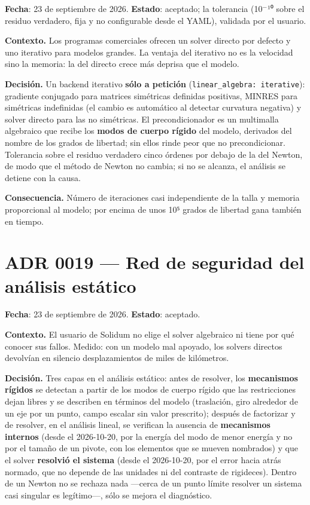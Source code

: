 \documentclass[11pt,oneside]{report}
\begin{document}
\textbf{Fecha}: 23 de septiembre de 2026. \textbf{Estado}: aceptado; la tolerancia (10\ensuremath{^{-}}¹⁰ sobre el residuo verdadero, fija y no configurable desde el YAML), validada por el usuario.

\textbf{Contexto.} Los programas comerciales ofrecen un solver directo por defecto y uno iterativo para modelos grandes. La ventaja del iterativo no es la velocidad sino la memoria: la del directo crece más deprisa que el modelo.

\textbf{Decisión.} Un backend iterativo \textbf{sólo a petición} (\texttt{linear\_\allowbreak{}algebra: iterative}): gradiente conjugado para matrices simétricas definidas positivas, MINRES para simétricas indefinidas (el cambio es automático al detectar curvatura negativa) y solver directo para las no simétricas. El precondicionador es un multimalla algebraico que recibe los \textbf{modos de cuerpo rígido} del modelo, derivados del nombre de los grados de libertad; sin ellos rinde peor que no precondicionar. Tolerancia sobre el residuo verdadero cinco órdenes por debajo de la del Newton, de modo que el método de Newton no cambia; si no se alcanza, el análisis se detiene con la causa.

\textbf{Consecuencia.} Número de iteraciones casi independiente de la talla y memoria proporcional al modelo; por encima de unos 10⁵ grados de libertad gana también en tiempo.

\section{ADR 0019 --- Red de seguridad del análisis estático}
\label{adr:0019}

\textbf{Fecha}: 23 de septiembre de 2026. \textbf{Estado}: aceptado.

\textbf{Contexto.} El usuario de Solidum no elige el solver algebraico ni tiene por qué conocer sus fallos. Medido: con un modelo mal apoyado, los solvers directos devolvían en silencio desplazamientos de miles de kilómetros.

\textbf{Decisión.} Tres capas en el análisis estático: antes de resolver, los \textbf{mecanismos rígidos} se detectan a partir de los modos de cuerpo rígido que las restricciones dejan libres y se describen en términos del modelo (traslación, giro alrededor de un eje por un punto, campo escalar sin valor prescrito); después de factorizar y de resolver, en el análisis lineal, se verifican la ausencia de \textbf{mecanismos internos} (desde el 2026-10-20, por la energía del modo de menor energía y no por el tamaño de un pivote, con los elementos que se mueven nombrados) y que el solver \textbf{resolvió el sistema} (desde el 2026-10-20, por el error hacia atrás normado, que no depende de las unidades ni del contraste de rigideces). Dentro de un Newton no se rechaza nada ---cerca de un punto límite resolver un sistema casi singular es legítimo---, sólo se mejora el diagnóstico.
\end{document}
